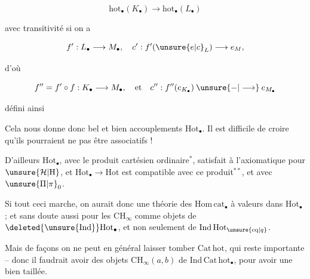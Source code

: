 \[
 \mathrm{hot}_{\bullet}(K_\bullet)\longrightarrow\mathrm{hot}_{\bullet}(L_\bullet)
\]

avec transitivité si on a

\[
 f':L_\bullet\longrightarrow M_\bullet,\quad c':f'(\unsure{e|c}_L)\longrightarrow e_M,
\]

d'où

\[
 f''=f'\circ f:K_\bullet\longrightarrow M_\bullet,\quad\text{et}\quad c'':f''(e_{K_\bullet})\mathbin{\unsure{-|\longrightarrow}}e_{M_\bullet}
\]

défini ainsi


Cela nous donne donc bel et bien accouplements  $\mathrm{Hot}_{\bullet}$. Il est difficile de croire qu'ils pourraient ne pas être associatifs !


D'ailleurs $\mathrm{Hot}_{\bullet}$, avec le produit cartésien ordinaire$^{*}$, satisfait à l'axiomatique   pour $\unsure{\mathcal H|\mathrm H}$, et $\mathrm{Hot}_{\bullet}\longrightarrow\mathrm{Hot}$ est compatible avec ce produit$^{**}$, et avec $\unsure{\Pi|\pi}_0$.



Si tout ceci marche, on aurait donc une théorie des $\mathrm{Hom\,cat}_{\bullet}$ à valeurs dans $\mathrm{Hot}_{\bullet}$ ; et sans doute aussi pour les $\mathrm{CH}_{\infty}$ comme objets de $\deleted{\unsure{\mathrm{Ind}}}\mathrm{Hot}_{\bullet}$, et non seulement de $\mathrm{Ind\,Hot}_{\unsure{\mathrm{eq}|q}}$.

Mais de  façons on ne peut en général laisser tomber $\mathrm{Cat\,hot}$, qui reste importante -- donc il faudrait avoir des objets $\mathrm{CH}_{\infty}(a,b)$ de $\mathrm{Ind\,Cat\,hot}_{\bullet}$, pour avoir une  bien taillée.

